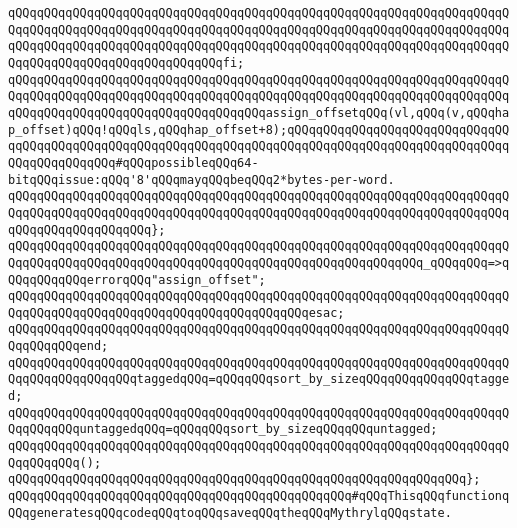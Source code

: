 \verb|qQQqqQQqqQQqqQQqqQQqqQQqqQQqqQQqqQQqqQQqqQQqqQQqqQQqqQQqqQQqqQQqqQQqqQQqqQQqqQQqqQQqqQQqqQQqqQQqqQQqqQQqqQQqqQQqqQQqqQQqqQQqqQQqqQQqqQQqqQQqqQQqqQQqqQQqqQQqqQQqqQQqqQQqqQQqqQQqqQQqqQQqqQQqqQQqqQQqqQQqqQQqqQQqqQQqqQQqqQQqqQQqqQQqqQQqqQQqqQQqfi;|\newline
\newline
\verb|qQQqqQQqqQQqqQQqqQQqqQQqqQQqqQQqqQQqqQQqqQQqqQQqqQQqqQQqqQQqqQQqqQQqqQQqqQQqqQQqqQQqqQQqqQQqqQQqqQQqqQQqqQQqqQQqqQQqqQQqqQQqqQQqqQQqqQQqqQQqqQQqqQQqqQQqqQQqqQQqqQQqqQQqqQQqqQQqassign_offsetqQQq(vl,qQQq(v,qQQqhap_offset)qQQq!qQQqls,qQQqhap_offset+8);qQQqqQQqqQQqqQQqqQQqqQQqqQQqqQQqqQQqqQQqqQQqqQQqqQQqqQQqqQQqqQQqqQQqqQQqqQQqqQQqqQQqqQQqqQQqqQQqqQQqqQQqqQQqqQQqqQQq#qQQqpossibleqQQq64-bitqQQqissue:qQQq'8'qQQqmayqQQqbeqQQq2*bytes-per-word.|\newline
\verb|qQQqqQQqqQQqqQQqqQQqqQQqqQQqqQQqqQQqqQQqqQQqqQQqqQQqqQQqqQQqqQQqqQQqqQQqqQQqqQQqqQQqqQQqqQQqqQQqqQQqqQQqqQQqqQQqqQQqqQQqqQQqqQQqqQQqqQQqqQQqqQQqqQQqqQQqqQQqqQQq};|\newline
\newline
\verb|qQQqqQQqqQQqqQQqqQQqqQQqqQQqqQQqqQQqqQQqqQQqqQQqqQQqqQQqqQQqqQQqqQQqqQQqqQQqqQQqqQQqqQQqqQQqqQQqqQQqqQQqqQQqqQQqqQQqqQQqqQQqqQQq_qQQqqQQq=>qQQqqQQqqQQqerrorqQQq"assign_offset";|\newline
\verb|qQQqqQQqqQQqqQQqqQQqqQQqqQQqqQQqqQQqqQQqqQQqqQQqqQQqqQQqqQQqqQQqqQQqqQQqqQQqqQQqqQQqqQQqqQQqqQQqqQQqqQQqqQQqqQQqesac;|\newline
\verb|qQQqqQQqqQQqqQQqqQQqqQQqqQQqqQQqqQQqqQQqqQQqqQQqqQQqqQQqqQQqqQQqqQQqqQQqqQQqqQQqend;|\newline
\newline
\verb|qQQqqQQqqQQqqQQqqQQqqQQqqQQqqQQqqQQqqQQqqQQqqQQqqQQqqQQqqQQqqQQqqQQqqQQqqQQqqQQqqQQqqQQqtaggedqQQq=qQQqqQQqsort_by_sizeqQQqqQQqqQQqqQQqtagged;|\newline
\verb|qQQqqQQqqQQqqQQqqQQqqQQqqQQqqQQqqQQqqQQqqQQqqQQqqQQqqQQqqQQqqQQqqQQqqQQqqQQqqQQquntaggedqQQq=qQQqqQQqsort_by_sizeqQQqqQQquntagged;|\newline
\newline
\verb|qQQqqQQqqQQqqQQqqQQqqQQqqQQqqQQqqQQqqQQqqQQqqQQqqQQqqQQqqQQqqQQqqQQqqQQqqQQqqQQq();|\newline
\verb|qQQqqQQqqQQqqQQqqQQqqQQqqQQqqQQqqQQqqQQqqQQqqQQqqQQqqQQqqQQqqQQq};|\newline
\newline
\newline
\verb|qQQqqQQqqQQqqQQqqQQqqQQqqQQqqQQqqQQqqQQqqQQqqQQq#qQQqThisqQQqfunctionqQQqgeneratesqQQqcodeqQQqtoqQQqsaveqQQqtheqQQqMythrylqQQqstate.|\newline
